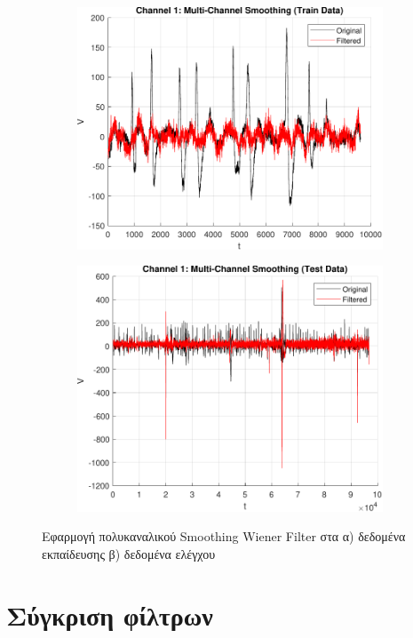 \documentclass[a4paper,12pt]{article}
\begin{document}
\begin{figure}[htbp]
    \centering
    \begin{subfigure}[b]{0.45\textwidth}
        \includegraphics[width=\textwidth]{plot/multi_channel_smoothing_train.pdf}
        \caption{}
        \label{fig:multi_channel_smoothing_train}
    \end{subfigure}
    \hfill
    \begin{subfigure}[b]{0.45\textwidth}
        \includegraphics[width=\textwidth]{plot/multi_channel_smoothing_test.pdf}
        \caption{}
        \label{fig:multi_channel_smoothing_test}
    \end{subfigure}

    \caption{Εφαρμογή πολυκαναλικού Smoothing Wiener Filter 
    στα α) δεδομένα εκπαίδευσης β) δεδομένα ελέγχου}
    \label{fig:multi_channel_smoothing}
\end{figure}

\section*{Σύγκριση φίλτρων}
\end{document}
